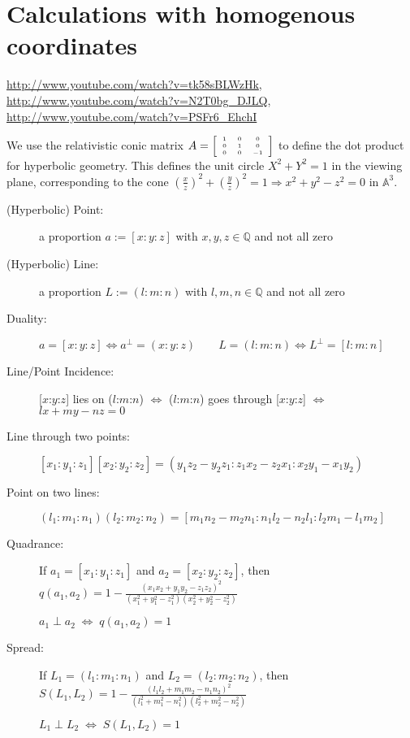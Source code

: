 \documentclass[DIV16,halfparskip]{scrartcl}
\newcommand{\C}{\!\!:\!\!}
\begin{document}
\section{Calculations with homogenous coordinates}
\url{http://www.youtube.com/watch?v=tk58sBLWzHk},
\url{http://www.youtube.com/watch?v=N2T0bg_DJLQ},
\url{http://www.youtube.com/watch?v=PSFr6_EhchI}

We use the relativistic conic matrix
$A=\tiny\left[\begin{array}{ccc}1 & 0 & 0\\ 0 & 1 & 0\\ 0 & 0 & -1\end{array}\right]$
to define the dot product for hyperbolic geometry. This defines
the unit circle $X^2+Y^2=1$ in the viewing plane, corresponding to the cone
$(\frac{x}{z})^2 + (\frac{y}{z})^2 = 1 \Rightarrow x^2+y^2-z^2=0$ in
$\mathbb{A}^3$.

\begin{description}
    \item[(Hyperbolic) Point:] a proportion $a:=[x\C y\C z]$ with
        $x,y,z\in\mathbb{Q}$ and not all zero
    \item[(Hyperbolic) Line:] a proportion $L:=(l\C m\C n)$ with
        $l,m,n\in\mathbb{Q}$ and not all zero
    \item[Duality:] \(a=[x\C y\C z] \Leftrightarrow a^\perp=(x\C y\C z) \qquad
        L=(l\C m\C n) \Leftrightarrow L^\perp=[l\C m\C n] \)
    \item[Line/Point Incidence:] [$x$:$y$:$z$] lies on ($l$:$m$:$n$)
        $\Leftrightarrow$ ($l$:$m$:$n$) goes through [$x$:$y$:$z$]
        $\Leftrightarrow$ $lx+my-nz=0$
    \item[Line through two points:] \([x_1\C y_1\C z_1][x_2\C y_2\C z_2] =
        (y_1z_2-y_2z_1 : z_1x_2-z_2x_1 : x_2y_1-x_1y_2) \)
    \item[Point on two lines:] \( (l_1\C m_1\C n_1) (l_2\C m_2\C n_2) = 
        [m_1n_2-m_2n_1 : n_1l_2-n_2l_1 : l_2m_1-l_1m_2] \)

    \item [Quadrance:] If $a_1=[x_1\C y_1\C z_1]$ and $a_2=[x_2\C y_2\C z_2]$, then
        \( q(a_1,a_2) = 1 - \frac{(x_1x_2 + y_1y_2 - z_1z_2)^2}{(x_1^2+y_1^2-z_1^2)(x_2^2+y_2^2-z_2^2)} \)

        $a_1 \perp a_2 \;\Leftrightarrow\; q(a_1,a_2) = 1$

    \item [Spread:] If $L_1=(l_1:m_1:n_1)$ and $L_2=(l_2:m_2:n_2)$, then
        \( S(L_1,L_2) = 1 - \frac{(l_1l_2 + m_1m_2 - n_1n_2)^2}
                                 {(l_1^2+m_1^2-n_1^2)(l_2^2+m_2^2-n_2^2)} \)

        $L_1 \perp L_2 \;\Leftrightarrow\; S(L_1,L_2) = 1$
\end{description}
\end{document}
